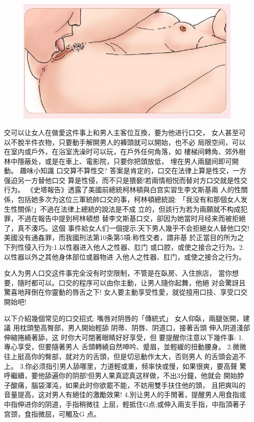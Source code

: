 \documentclass[12pt,UTF8]{ctexbook}
\begin{document}
\begin{figure}[htbp]
	\centering
	\includegraphics[width=0.7\linewidth]{19}
	\caption{}
	\label{fig:1}
\end{figure}

交可以让女人在做愛这件事上和男人主客位互換，要为他进行口交，
女人甚至可以不脫半件衣物，只要動手解開男人的褲頭就可以開始，也不必
局限空间，可以在室内或戶外，在浴室洗澡时可以玩，在戶外任何角落，如
樓梯间轉角、郊外樹林中隱蔽处，或是在車上、電影院，只要你把頭放低，
埋在男人兩腿间即可開動。
趣味小知識
口交算不算性交?
答案是肯定的，口交在法律上算是性交，一方强迫另一方替他口交
算是性侵，而不只是猥褻!若兩情相悦而替对方口交就是性交行为。
《史塔報告》透露了美國前總統柯林頓與白宫实習生李文斯基兩
人的性關係，包括她多次为这位三軍統帥口交的事，柯林頓總統說:
「我没有和那個女人发生性關係!」不過在法律上總統的說法是不成
立的，但該行为若为兩願就不构成犯罪，不過在報告中提到柯林頓想
替李文斯基口交，卻因为她當时月经来而被拒絕了，真不湊巧。这個
事件給女人们一個提示:天下男人幾乎不会拒絕女人替他口交!
美國没有通姦罪，而我國刑法第10条第5項:称性交者，謂非基
於正當目的所为之下列性侵入行为:1.以性器进入他人之性器、肛门
或口腔，或使之接合之行为。2.以性器以外之其他身体部位或器物进
入他人之性器、肛门，或使之接合之行为。

女人为男人口交这件事完全没有时空限制，不管是在臥房、入住旅店，
當你想要，隨时都可以。口交的程序可以由你主動，让男人隨你起舞，他絕
对会驚訝且驚喜地拜倒在你靈動的唇舌之下!
女人要主動享受性愛，就從擅用口技、享受口交開始吧!

以下介紹幾個常见的口交招式:
嘴唇对阴唇的「傳統式」
女人仰臥，兩腿张開，建議
用枕頭墊高臀部，男人開始輕舔
阴蒂、阴唇、阴道口，接著舌頭
伸入阴道淺部伸縮捲繞著舔，这
时你大可閉著眼睛好好享受，但
要提醒你注意以下幾件事:
1.專心享受，但要隨著男人
舌頭轉繞自然呻吟、蹙眉，並輕緩的扭動腰身。
2.微微往上挺高你的臀部，就对方的舌頭，但是切忌動作太大，否则男人
的舌頭会追不上。
3.你必须指引男人舔哪里，力道輕或重，频率快或慢，如果很爽，要高聲
驚呼繼續，要他舔遍你的阴部!但男人果真認真这样做，不出3分鐘，他就会
開始脖子酸痛，腦袋渾沌，如果此时你欲罷不能，不妨用雙手扶住他的頭，
且把爽叫的音量提高，这对男人有絕佳的激勵效果!
4.別让男人的手閒著，提醒男人用食指或中指伸进你的阴道，手指稍微往
上屈，輕抵住G点;或伸入兩支手指，中指頂著子宫颈，食指微屈，可觸及G
点。
\end{document}
